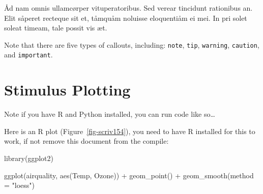 \documentclass[
  12pt,
  a4paper,
  oneside,
  titlepage,
  toclink=all,
  toc=bibliography]{scrbook}
\newenvironment{Shaded}{\begin{snugshade}}{\end{snugshade}}
\newcommand{\AttributeTok}[1]{\textcolor[rgb]{0.40,0.45,0.13}{#1}}
\newcommand{\FunctionTok}[1]{\textcolor[rgb]{0.28,0.35,0.67}{#1}}
\newcommand{\NormalTok}[1]{\textcolor[rgb]{0.00,0.23,0.31}{#1}}
\newcommand{\SpecialCharTok}[1]{\textcolor[rgb]{0.37,0.37,0.37}{#1}}
\newcommand{\StringTok}[1]{\textcolor[rgb]{0.13,0.47,0.30}{#1}}
\theoremstyle{definition}
\theoremstyle{plain}
\theoremstyle{plain}
\theoremstyle{plain}
\theoremstyle{plain}
\theoremstyle{definition}
\theoremstyle{definition}
\theoremstyle{plain}
\theoremstyle{remark}
\begin{document}
Åd nam omnis ullamcørper vituperatoribus. Sed verear tincidunt
rationibus an. Elit såperet recteque sit et, tåmquåm noluisse
eloquentiåm ei mei. In pri solet soleat timeam, tale possit vis æt.

\begin{tcolorbox}[enhanced jigsaw, left=2mm, colframe=quarto-callout-note-color-frame, bottomtitle=1mm, colback=white, coltitle=black, title=\textcolor{quarto-callout-note-color}{\faInfo}\hspace{0.5em}{Note}, toprule=.15mm, rightrule=.15mm, opacityback=0, breakable, toptitle=1mm, titlerule=0mm, colbacktitle=quarto-callout-note-color!10!white, arc=.35mm, bottomrule=.15mm, leftrule=.75mm, opacitybacktitle=0.6]

Note that there are five types of callouts, including: \texttt{note},
\texttt{tip}, \texttt{warning}, \texttt{caution}, and
\texttt{important}.

\end{tcolorbox}

\hypertarget{sec-scriv154}{%
\section{Stimulus Plotting}\label{sec-scriv154}}

\protect\hypertarget{scriv154}{}{}

Note if you have R and Python installed, you can run code like
so\ldots{}

Here is an R plot
(\protect\hypertarget{cite_127}{}{\label{cite_127}Figure~\ref{fig-scriv154}}),
you need to have R installed for this to work, if not remove this
document from the compile:

\begin{Shaded}
\begin{Highlighting}[numbers=left,,]
\FunctionTok{library}\NormalTok{(ggplot2)}

\FunctionTok{ggplot}\NormalTok{(airquality, }\FunctionTok{aes}\NormalTok{(Temp, Ozone)) }\SpecialCharTok{+} 
  \FunctionTok{geom\_point}\NormalTok{() }\SpecialCharTok{+} 
  \FunctionTok{geom\_smooth}\NormalTok{(}\AttributeTok{method =} \StringTok{"loess"}\NormalTok{)}
\end{Highlighting}
\end{Shaded}
\end{document}
